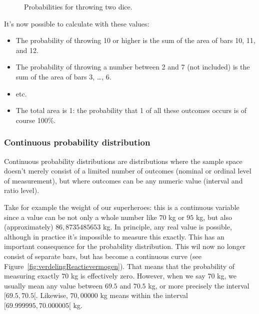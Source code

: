 \begin{figure}
  \centering
  \caption{Probabilities for throwing two dice.}
  \label{fig:probabilities-2-dice}
\end{figure}

It's now possible to calculate with these values:

\begin{itemize}
  \item The probability of throwing 10 or higher is the sum of the area of bars 10, 11, and 12.
  \item The probability of throwing a number between 2 and 7 (not included) is the sum of the area of bars 3, \ldots, 6.
  \item etc.
  \item The total area is 1: the probability that 1 of all these outcomes occurs is of course 100\%.
\end{itemize}

\subsubsection{Continuous probability distribution}

Continuous probability distributions are distributions where the sample space doesn't merely consist of a limited number of outcomes (nominal or ordinal level of measurement), but where outcomes can be any numeric value (interval and ratio level).

Take for example the weight of our superheroes: this is a continuous variable since a value can be not only a whole number like $70$ kg or $95$ kg, but also (approximately) $86,8735485653$ kg. In principle, any real value is possible, although in practice it's impossible to measure this exactly. This has an important consequence for the probability distribution. This wil now no longer consist of separate bars, but has become a continuous curve (see Figure~\ref{fig:verdelingReactievermogen}). That means that the probability of measuring exactly $70$ kg is effectively zero. However, when we say $70$ kg, we usually mean any value between $69.5$ and $70.5$ kg, or more precisely the interval $[69.5, 70.5[$. Likewise, $70,00000$ kg means within the interval $[69.999995, 70.000005[$ kg.

